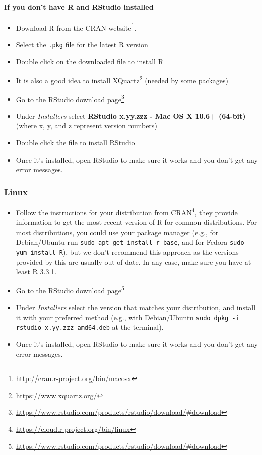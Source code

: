 \documentclass[
  12pt,
]{book}
\newcommand{\passthrough}[1]{#1}
\providecommand{\tightlist}{%
  \setlength{\itemsep}{0pt}\setlength{\parskip}{0pt}}
\renewcommand{\href}[2]{#2\footnote{\url{#1}}}
\theoremstyle{definition}
\theoremstyle{definition}
\theoremstyle{definition}
\newcommand{\1}{\mathbbm{1}}
\begin{document}
\hypertarget{if-you-dont-have-r-and-rstudio-installed-1}{%
\paragraph{If you don't have R and RStudio installed}\label{if-you-dont-have-r-and-rstudio-installed-1}}

\begin{itemize}
\tightlist
\item
  Download R from the \href{http://cran.r-project.org/bin/macosx}{CRAN website}.
\item
  Select the \passthrough{\lstinline!.pkg!} file for the latest R version
\item
  Double click on the downloaded file to install R
\item
  It is also a good idea to install \href{https://www.xquartz.org/}{XQuartz} (needed
  by some packages)
\item
  Go to the \href{https://www.rstudio.com/products/rstudio/download/\#download}{RStudio download
  page}
\item
  Under \emph{Installers} select \textbf{RStudio x.yy.zzz - Mac OS X 10.6+ (64-bit)}
  (where x, y, and z represent version numbers)
\item
  Double click the file to install RStudio
\item
  Once it's installed, open RStudio to make sure it works and you don't get any
  error messages.
\end{itemize}

\hypertarget{linux}{%
\subsubsection{Linux}\label{linux}}

\begin{itemize}
\tightlist
\item
  Follow the instructions for your distribution from
  \href{https://cloud.r-project.org/bin/linux}{CRAN}, they provide information to get
  the most recent version of R for common distributions. For most distributions,
  you could use your package manager (e.g., for Debian/Ubuntu run \passthrough{\lstinline!sudo apt-get install r-base!}, and for Fedora \passthrough{\lstinline!sudo yum install R!}), but we don't recommend
  this approach as the versions provided by this are usually out of date. In any
  case, make sure you have at least R 3.3.1.
\item
  Go to the \href{https://www.rstudio.com/products/rstudio/download/\#download}{RStudio download
  page}
\item
  Under \emph{Installers} select the version that matches your distribution, and
  install it with your preferred method (e.g., with Debian/Ubuntu \passthrough{\lstinline!sudo dpkg -i rstudio-x.yy.zzz-amd64.deb!} at the terminal).
\item
  Once it's installed, open RStudio to make sure it works and you don't get any
  error messages.
\end{itemize}
\end{document}
